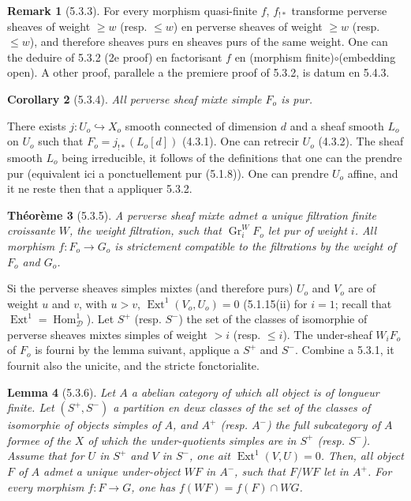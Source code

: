 \documentclass[12pt,a4paper]{article}
\theoremstyle{plain}
\newtheorem{theorem}{Th\'eor\`eme}[section]
\newtheorem{lemma}[theorem]{Lemma}
\newtheorem{corollary}[theorem]{Corollary}
\theoremstyle{definition}
\newtheorem{remark}[theorem]{Remark}
\theoremstyle{remark}
\DeclareMathOperator{\Hom}{Hom}
\DeclareMathOperator{\Ext}{Ext}
\DeclareMathOperator{\Gr}{Gr}
\newcommand{\cD}{\mathcal{D}}
\begin{document}
\begin{remark}[5.3.3]
For every morphism quasi-finite $f$, $f_{!*}$ transforme perverse sheaves of weight $\geq w$ (resp. $\leq w$) en perverse sheaves of weight $\geq w$ (resp. $\leq w$), and therefore sheaves purs en sheaves purs of the same weight. One can the deduire of 5.3.2 (2e proof) en factorisant $f$ en (morphism finite)$\circ$(embedding open). A other proof, parallele a the premiere proof of 5.3.2, is datum en 5.4.3.
\end{remark}

\begin{corollary}[5.3.4]
All perverse sheaf mixte simple $F_o$ is pur.
\end{corollary}

There exists $j: U_o \hookrightarrow X_o$ smooth connected of dimension $d$ and a sheaf smooth $L_o$ on $U_o$ such that $F_o = j_{!*}(L_o[d])$ (4.3.1). One can retrecir $U_o$ (4.3.2). The sheaf smooth $L_o$ being irreducible, it follows of the definitions that one can the prendre pur (equivalent ici a ponctuellement pur (5.1.8)). One can prendre $U_o$ affine, and it ne reste then that a appliquer 5.3.2.

\begin{theorem}[5.3.5]
A perverse sheaf mixte admet a unique filtration finite croissante $W$, the weight filtration, such that $\Gr_i^W F_o$ let pur of weight $i$. All morphism $f: F_o \to G_o$ is strictement compatible to the filtrations by the weight of $F_o$ and $G_o$.
\end{theorem}

Si the perverse sheaves simples mixtes (and therefore purs) $U_o$ and $V_o$ are of weight $u$ and $v$, with $u > v$, $\Ext^1(V_o, U_o) = 0$ (5.1.15(ii) for $i=1$; recall that $\Ext^1 = \Hom^1_{\cD}$). Let $S^+$ (resp. $S^-$) the set of the classes of isomorphie of perverse sheaves mixtes simples of weight $> i$ (resp. $\leq i$). The under-sheaf $W_iF_o$ of $F_o$ is fourni by the lemma suivant, applique a $S^+$ and $S^-$. Combine a 5.3.1, it fournit also the unicite, and the stricte fonctorialite.

\begin{lemma}[5.3.6]
Let $A$ a abelian category of which all object is of longueur finite. Let $(S^+, S^-)$ a partition en deux classes of the set of the classes of isomorphie of objects simples of $A$, and $A^+$ (resp. $A^-$) the full subcategory of $A$ formee of the $X$ of which the under-quotients simples are in $S^+$ (resp. $S^-$). Assume that for $U$ in $S^+$ and $V$ in $S^-$, one ait $\Ext^1(V,U) = 0$. Then, all object $F$ of $A$ admet a unique under-object $WF$ in $A^-$, such that $F/WF$ let in $A^+$. For every morphism $f: F \to G$, one has $f(WF) = f(F) \cap WG$.
\end{lemma}
\end{document}
